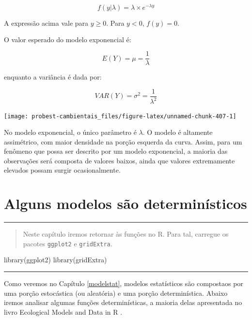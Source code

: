 \documentclass[
]{book}
\newenvironment{Shaded}{\begin{snugshade}}{\end{snugshade}}
\newcommand{\FunctionTok}[1]{\textcolor[rgb]{0.00,0.00,0.00}{#1}}
\newcommand{\NormalTok}[1]{#1}
\begin{document}
\[f(y|\lambda) = \lambda \times e^{-\lambda y}\]

A expressão acima vale para \(y \ge 0\). Para \(y < 0\), \(f(y) = 0\).

O valor esperado do modelo exponencial é:

\[E(Y) = \mu = \frac{1}{\lambda}\]

enquanto a variância é dada por:

\[VAR(Y) = \sigma^2 = \frac{1}{\lambda^2}\]

\begin{center}\texttt{[image: probest-cambientais\_files/figure-latex/unnamed-chunk-407-1]} \end{center}

No modelo exponencial, o único parâmetro é \(\lambda\). O modelo é altamente assimétrico, com maior densidade na porção esquerda da curva. Assim, para um fenômeno que possa ser descrito por um modelo exponencial, a maioria das observações será composta de valores baixos, ainda que valores extremamente elevados possam surgir ocasionalmente.

\hypertarget{detmodel}{%
\chapter{Alguns modelos são determinísticos}\label{detmodel}}

\begin{center}\rule{0.5\linewidth}{0.5pt}\end{center}

\begin{quote}
Neste capítulo iremos retornar às funções no R. Para tal, carregue os pacotes \texttt{ggplot2} e \texttt{gridExtra}.
\end{quote}

\begin{Shaded}
\begin{Highlighting}[]
\FunctionTok{library}\NormalTok{(ggplot2)}
\FunctionTok{library}\NormalTok{(gridExtra)}
\end{Highlighting}
\end{Shaded}

\begin{center}\rule{0.5\linewidth}{0.5pt}\end{center}

Como veremos no Capítulo \ref{modelstat}, modelos estatísticos são compostaos por uma porção estocástica (ou aleatória) e uma porção determinística. Abaixo iremos analisar algumas funções determinísticas, a maioria delas apresentada no livro Ecological Models and Data in R \citep{bolker2008ecological}.
\end{document}

